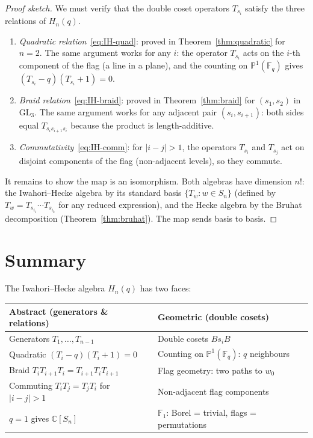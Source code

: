 \documentclass[12pt,a4paper]{article}
\theoremstyle{definition}
\theoremstyle{remark}
\newcommand{\C}{\mathbb{C}}
\newcommand{\F}{\mathbb{F}}
\newcommand{\GL}{\mathrm{GL}}
\newcommand{\PP}{\mathbb{P}}
\begin{document}
\begin{proof}[Proof sketch]
We must verify that the double coset operators $T_{s_i}$ satisfy
the three relations of $H_n(q)$.

\begin{enumerate}
\item \emph{Quadratic relation}~\eqref{eq:IH-quad}: proved in
  Theorem~\ref{thm:quadratic} for $n = 2$. The same argument works
  for any $i$: the operator $T_{s_i}$ acts on the $i$-th component
  of the flag (a line in a plane), and the counting on $\PP^1(\F_q)$
  gives $(T_{s_i} - q)(T_{s_i} + 1) = 0$.

\item \emph{Braid relation}~\eqref{eq:IH-braid}: proved in
  Theorem~\ref{thm:braid} for $(s_1, s_2)$ in $\GL_3$. The same
  argument works for any adjacent pair $(s_i, s_{i+1})$: both sides
  equal $T_{s_i s_{i+1} s_i}$ because the product is length-additive.

\item \emph{Commutativity}~\eqref{eq:IH-comm}: for $|i - j| > 1$,
  the operators $T_{s_i}$ and $T_{s_j}$ act on disjoint components
  of the flag (non-adjacent levels), so they commute.
\end{enumerate}

It remains to show the map is an isomorphism. Both algebras have
dimension $n!$: the Iwahori--Hecke algebra by its standard basis
$\{T_w : w \in S_n\}$ (defined by $T_w = T_{s_{i_1}} \cdots
T_{s_{i_k}}$ for any reduced expression), and the Hecke algebra by
the Bruhat decomposition (Theorem~\ref{thm:bruhat}). The map sends
basis to basis.
\end{proof}

\section{Summary}
\label{sec:summary}

The Iwahori--Hecke algebra $H_n(q)$ has two faces:

\begin{center}
\renewcommand{\arraystretch}{1.5}
\begin{tabular}{@{}p{5.5cm}p{5.5cm}@{}}
\toprule
\textbf{Abstract (generators \& relations)}
  & \textbf{Geometric (double cosets)} \\
\midrule
Generators $T_1, \ldots, T_{n-1}$
  & Double cosets $Bs_iB$ \\
Quadratic $(T_i - q)(T_i + 1) = 0$
  & Counting on $\PP^1(\F_q)$: $q$ neighbours \\
Braid $T_iT_{i+1}T_i = T_{i+1}T_iT_{i+1}$
  & Flag geometry: two paths to $w_0$ \\
Commuting $T_iT_j = T_jT_i$ for $|i-j|>1$
  & Non-adjacent flag components \\
$q = 1$ gives $\C[S_n]$
  & $\F_1$: Borel = trivial, flags = permutations \\
\bottomrule
\end{tabular}
\end{center}
\end{document}

